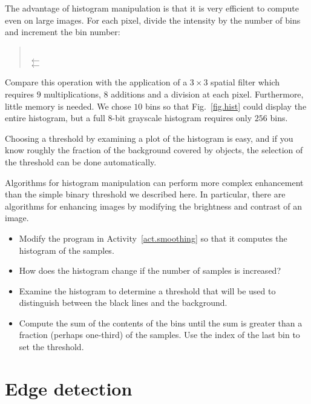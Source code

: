 The advantage of histogram manipulation is that it is very efficient to compute even on large images. For each pixel, divide the intensity by the number of bins and increment the bin number:
\begin{quote}
\\
\hspace*{2em} $\leftarrow$ \\
\hspace*{2em} $\leftarrow$ 
\end{quote}
Compare this operation with the application of a $3\times 3$ spatial filter which requires $9$ multiplications, $8$ additions and a division at each pixel. Furthermore, little memory is needed. We chose $10$ bins so that Fig.~\ref{fig.hist} could display the entire histogram, but a full $8$-bit grayscale histogram requires only $256$ bins.

Choosing a threshold by examining a plot of the histogram is easy, and if you know roughly the fraction of the background covered by objects, the selection of the threshold can be done automatically.

Algorithms for histogram manipulation can perform more complex enhancement than the simple binary threshold we described here. In particular, there are algorithms for enhancing images by modifying the brightness and contrast of an image. 

\begin{framed}
\begin{itemize}
\item Modify the program in Activity~\ref{act.smoothing} so that it computes the histogram of the samples.
\item How does the histogram change if the number of samples is increased?
\item Examine the histogram to determine a threshold that will be used to distinguish between the black lines and the background.
\item Compute the sum of the contents of the bins until the sum is greater than a fraction (perhaps one-third) of the samples. Use the index of the last bin to set the threshold.
\end{itemize}
\end{framed}

\section{Edge detection}\label{s.edge-detection}

